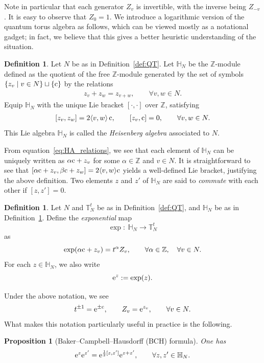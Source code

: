 \documentclass[pdftex]{sigma}
\numberwithin{equation}{section}
\newtheorem{Proposition}[Theorem]{Proposition}
\theoremstyle{definition}
\newtheorem{Definition}[Theorem]{Definition}
\begin{document}
Note in particular that each generator $Z_v$ is invertible, with the inverse being $Z_{-v}$. It is easy to observe that $Z_0 = 1$.
We introduce a logarithmic version of the quantum torus algebra as follows, which can be viewed mostly as a notational gadget; in fact, we believe that this gives a better heuristic understanding of the situation.
\begin{Definition}
\label{def:HA}
Let $N$ be as in Definition~\ref{def:QT}. Let $\mathbb{H}_N$ be the $\mathbb{Z}$-module defined as the quotient of the free $\mathbb{Z}$-module generated by the set of symbols $\{ z_v \mid v\in N\} \sqcup \{{\rm c}\}$ by the relations
\begin{align}
\label{eq:HA_relations}
z_v + z_w = z_{v+w}, \qquad \forall v,w\in N.
\end{align}
Equip $\mathbb{H}_N$ with the unique Lie bracket $[\cdot,\cdot]$ over $\mathbb{Z}$, satisfying
\begin{align}
\label{eq:HA_commutation}
[z_v, z_w] = 2 \langle v,w\rangle \, {\rm c}, \qquad [z_v,{\rm c}]=0, \qquad \forall v,w\in N.
\end{align}
This Lie algebra $\mathbb{H}_N$ is called the {\em Heisenberg algebra} associated to $N$.
\end{Definition}
From equation~\eqref{eq:HA_relations}, we see that each element of $\mathbb{H}_N$ can be uniquely written as $\alpha {\rm c} + z_v$ for some $\alpha \in \mathbb{Z}$ and $v\in N$. It is straightforward to see that $[\alpha {\rm c} + z_v, \beta {\rm c} + z_w ] = 2 \langle v,w\rangle {\rm c}$ yields a well-defined Lie bracket, justifying the above definition. Two elements $z$ and $z'$ of $\mathbb{H}_N$ are said to {\em commute} with each other if $[z,z']=0$.
\begin{Definition}
\label{def:HA_exp}
Let $N$ and $\mathbb{T}^t_N$ be as in Definition~\ref{def:QT}, and $\mathbb{H}_N$ be as in Definition~\ref{def:HA}. Define the {\em exponential} map
\[
\exp \colon \ \mathbb{H}_N \to \mathbb{T}^t_N
\]
as
\[
\exp( \alpha {\rm c} + z_v ) = t^\alpha Z_v, \qquad \forall \alpha \in \mathbb{Z}, \quad \forall v\in N.
\]
For each $z\in \mathbb{H}_N$, we also write
\[
{\rm e}^z := \exp(z).
\]
\end{Definition}
Under the above notation, we see
\[
t^{\pm 1} = {\rm e}^{\pm {\rm c}}, \qquad Z_v = {\rm e}^{z_v}, \qquad \forall v\in N.
\]
What makes this notation particularly useful in practice is the following.
\begin{Proposition}[Baker--Campbell--Hausdorff (BCH) formula]
\label{prop:BCH}
One has
\[
{\rm e}^z {\rm e}^{z'} = {\rm e}^{\frac{1}{2} [z,z']} {\rm e}^{z+z'}, \qquad \forall z,z' \in \mathbb{H}_N.
\]
\end{Proposition}
\end{document}

